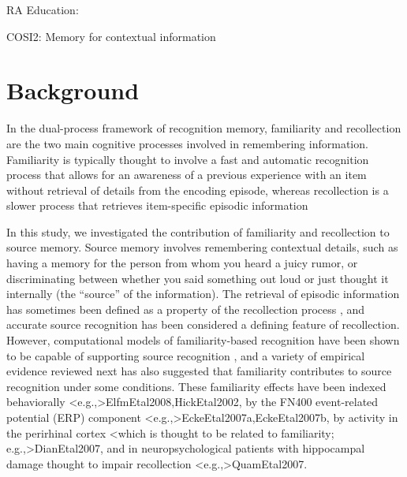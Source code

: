 \documentclass[12pt,doc]{apa}
\begin{document}

\begin{center}
\large{RA Education:}

\large{COSI2: Memory for contextual information}
\end{center}

\vspace{0.1cm}

\section*{Background}

In the dual-process framework of recognition memory, familiarity and
recollection are the two main cognitive processes involved in
remembering information.  Familiarity is typically thought to involve
a fast and automatic recognition process that allows for an awareness
of a previous experience with an item without retrieval of details
from the encoding episode, whereas recollection is a slower process
that retrieves item-specific episodic information \cite{Yone2002}

In this study, we investigated the contribution of familiarity and
recollection to source memory.  Source memory involves remembering
contextual details, such as having a memory for the person from whom
you heard a juicy rumor, or discriminating between whether you said
something out loud or just thought it internally (the ``source'' of
the information).  The retrieval of episodic information has sometimes
been defined as a property of the recollection process
, and accurate source
recognition has been considered a defining feature of recollection.
However, computational models of familiarity-based recognition have
been shown to be capable of supporting source recognition
, and a variety of empirical evidence reviewed
next has also suggested that familiarity contributes to source
recognition under some conditions.  These familiarity effects have
been indexed behaviorally
\shortcite<e.g.,>{ElfmEtal2008,HickEtal2002}, by the FN400
event-related potential (ERP) component
\shortcite<e.g.,>{EckeEtal2007a,EckeEtal2007b}, by activity in the
perirhinal cortex \shortcite<which is thought to be related to
familiarity; e.g.,>{DianEtal2007}, and in neuropsychological patients
with hippocampal damage thought to impair recollection
\shortcite<e.g.,>{QuamEtal2007}.
\end{document}
